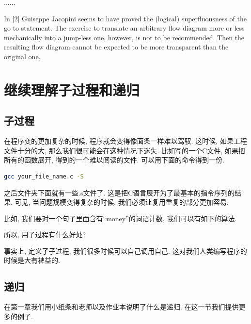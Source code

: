 \begin{pas}
......

In [2] Guiseppe Jacopini seems to have proved the (logical) superfluousness of the go to statement. The exercise to translate an arbitrary flow diagram more or less mechanically into a jump-less one, however, is not to be recommended. Then the resulting flow diagram cannot be expected to be more transparent than the original one.


	
\end{pas}
 
\section{继续理解子过程和递归}

\subsection*{子过程}

在程序变的更加复杂的时候, 程序就会变得像面条一样难以驾驭. 这时候, 如果工程文件十分的大, 那么我们很可能会在这种情况下迷失. 比如写的一个C文件, 如果把所有的函数展开, 得到的一个难以阅读的文件. 可以用下面的命令得到一份. 

\begin{lstlisting}[language=sh]
	gcc your_file_name.c -S
\end{lstlisting}

之后文件夹下面就有一些.s文件了. 这是把C语言展开为了最基本的指令序列的结果. 可见, 当问题规模变得复杂的时候, 我们必须让复用重复的部分更加容易. 

比如, 我们要对一个句子里面含有``money''的词语计数, 我们可以有如下的算法. 


\begin{bonus}
	所以, 用子过程有什么好处? 
\end{bonus}

事实上, 定义了子过程, 我们很多时候可以自己调用自己. 这对我们人类编写程序的时候是大有裨益的. 


\subsection*{递归}

在第一章我们用小纸条和老师以及作业本说明了什么是递归. 在这一节我们提供更多的例子. 


\begin{prob}[Hanoi塔问题]
 
\end{prob}

















